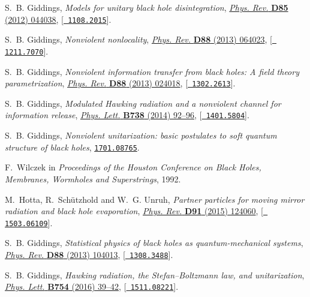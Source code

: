 \documentclass[12pt]{article}
\begin{document}
\begin{thebibliography}{100}
S.~B. Giddings, \emph{{Models for unitary black hole disintegration}},
  \href{http://dx.doi.org/10.1103/PhysRevD.85.044038}{\emph{Phys. Rev.} {\bf
  D85} (2012) 044038}, [\href{http://arxiv.org/abs/1108.2015}{{\tt
  1108.2015}}].

S.~B. Giddings, \emph{{Nonviolent nonlocality}},
  \href{http://dx.doi.org/10.1103/PhysRevD.88.064023}{\emph{Phys. Rev.} {\bf
  D88} (2013) 064023}, [\href{http://arxiv.org/abs/1211.7070}{{\tt
  1211.7070}}].

S.~B. Giddings, \emph{{Nonviolent information transfer from black holes: A
  field theory parametrization}},
  \href{http://dx.doi.org/10.1103/PhysRevD.88.024018}{\emph{Phys. Rev.} {\bf
  D88} (2013) 024018}, [\href{http://arxiv.org/abs/1302.2613}{{\tt
  1302.2613}}].

S.~B. Giddings, \emph{{Modulated Hawking radiation and a nonviolent channel for
  information release}},
  \href{http://dx.doi.org/10.1016/j.physletb.2014.08.070}{\emph{Phys. Lett.}
  {\bf B738} (2014) 92--96}, [\href{http://arxiv.org/abs/1401.5804}{{\tt
  1401.5804}}].

S.~B. Giddings, \emph{{Nonviolent unitarization: basic postulates to soft
  quantum structure of black holes}},
  \href{http://arxiv.org/abs/1701.08765}{{\tt 1701.08765}}.

F.~Wilczek in \emph{{Proceedings of the Houston Conference on Black Holes,
  Membranes, Wormholes and Superstrings}}, 1992.

M.~Hotta, R.~Schützhold and W.~G. Unruh, \emph{{Partner particles for moving
  mirror radiation and black hole evaporation}},
  \href{http://dx.doi.org/10.1103/PhysRevD.91.124060}{\emph{Phys. Rev.} {\bf
  D91} (2015) 124060}, [\href{http://arxiv.org/abs/1503.06109}{{\tt
  1503.06109}}].

S.~B. Giddings, \emph{{Statistical physics of black holes as quantum-mechanical
  systems}}, \href{http://dx.doi.org/10.1103/PhysRevD.88.104013}{\emph{Phys.
  Rev.} {\bf D88} (2013) 104013}, [\href{http://arxiv.org/abs/1308.3488}{{\tt
  1308.3488}}].

S.~B. Giddings, \emph{{Hawking radiation, the Stefan–Boltzmann law, and
  unitarization}},
  \href{http://dx.doi.org/10.1016/j.physletb.2015.12.076}{\emph{Phys. Lett.}
  {\bf B754} (2016) 39--42}, [\href{http://arxiv.org/abs/1511.08221}{{\tt
  1511.08221}}].


\end{thebibliography}
\end{document}
